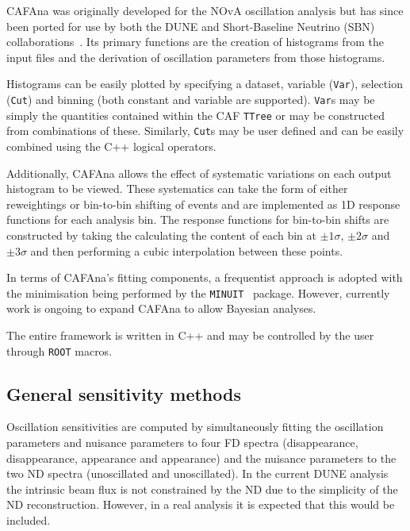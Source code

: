 CAFAna was originally developed for the NOvA oscillation analysis but has since been ported for use by both the DUNE and Short-Baseline Neutrino (SBN) collaborations~\cite{cafana}.
Its primary functions are the creation of histograms from the input files and the derivation of oscillation parameters from those histograms.

Histograms can be easily plotted by specifying a dataset, variable (\texttt{Var}), selection (\texttt{Cut}) and binning (both constant and variable are supported). 
\texttt{Var}s may be simply the quantities contained within the CAF \texttt{TTree} or may be constructed from combinations of these.
Similarly, \texttt{Cut}s may be user defined and can be easily combined using the C++ logical operators.

Additionally, CAFAna allows the effect of systematic variations on each output histogram to be viewed. 
These systematics can take the form of either reweightings or bin-to-bin shifting of events and are implemented as 1D response functions for each analysis bin.
The response functions for bin-to-bin shifts are constructed by taking the calculating the content of each bin at $\pm 1 \sigma$, $\pm 2 \sigma$ and $\pm 3 \sigma$ and then performing a cubic interpolation between these points.

In terms of CAFAna's fitting components, a frequentist approach is adopted with the minimisation being performed by the \texttt{MINUIT}~\cite{minuit} package.
However, currently work is ongoing to expand CAFAna to allow Bayesian analyses.

The entire framework is written in C++ and may be controlled by the user through \texttt{ROOT} macros.

\subsection{General sensitivity methods}
\label{sec:dune_lbl:sensitivities:general}

Oscillation sensitivities are computed by simultaneously fitting the oscillation parameters and nuisance parameters to four FD spectra (\numu disappearance, \anumu disappearance, \nue appearance and \anue appearance) and the nuisance parameters to the two ND spectra (\numu unoscillated and \anumu unoscillated).
In the current DUNE analysis the intrinsic \nue beam flux is not constrained by the ND due to the simplicity of the ND reconstruction.
However, in a real analysis it is expected that this would be included.

